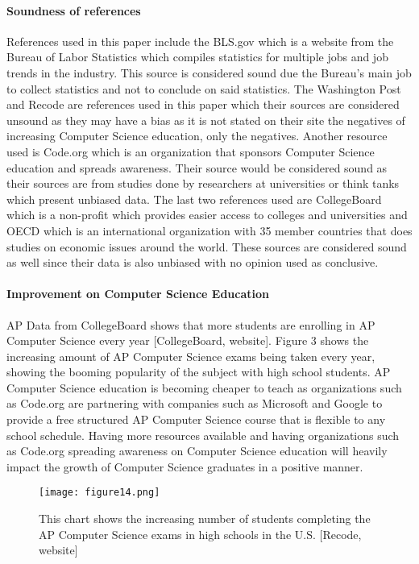 \documentclass[12pt, letterpaper]{report}
\begin{document}
\paragraph*{Soundness of references \\}
References used in this paper include the BLS.gov which is a website from the Bureau of Labor Statistics which compiles statistics for multiple jobs and job trends in the industry. This source is considered sound due the Bureau's main job to collect statistics and not to conclude on said statistics. The Washington Post and Recode are references used in this paper which their sources are considered unsound as they may have a bias as it is not stated on their site the negatives of increasing Computer Science education, only the negatives. Another resource used is Code.org which is an organization that sponsors Computer Science education and spreads awareness. Their source would be considered sound as their sources are from studies done by researchers at universities or think tanks which present unbiased data. The last two references used are CollegeBoard which is a non-profit which provides easier access to colleges and universities and OECD which is an international organization with 35 member countries that does studies on economic issues around the world. These sources are considered sound as well since their data is also unbiased with no opinion used as conclusive. 

\paragraph*{Improvement on Computer Science Education \\}
AP Data from CollegeBoard shows that more students are enrolling in AP Computer Science every year [CollegeBoard, website]. Figure 3 shows the increasing amount of AP Computer Science exams being taken every year, showing the booming popularity of the subject with high school students. AP Computer Science education is becoming cheaper to teach as organizations such as Code.org are partnering with companies such as Microsoft and Google to provide a free structured AP Computer Science course that is flexible to any school schedule. Having more resources available and having organizations such as Code.org spreading awareness on Computer Science education will heavily impact the growth of Computer Science graduates in a positive manner.

\begin{figure}[H]
    \centering
    \texttt{[image: figure14.png]}
    \captionsetup{justification=centering}
    \caption{This chart shows the increasing number of students completing the AP Computer Science exams in high schools in the U.S. [Recode, website]}
\end{figure}
\end{document}
